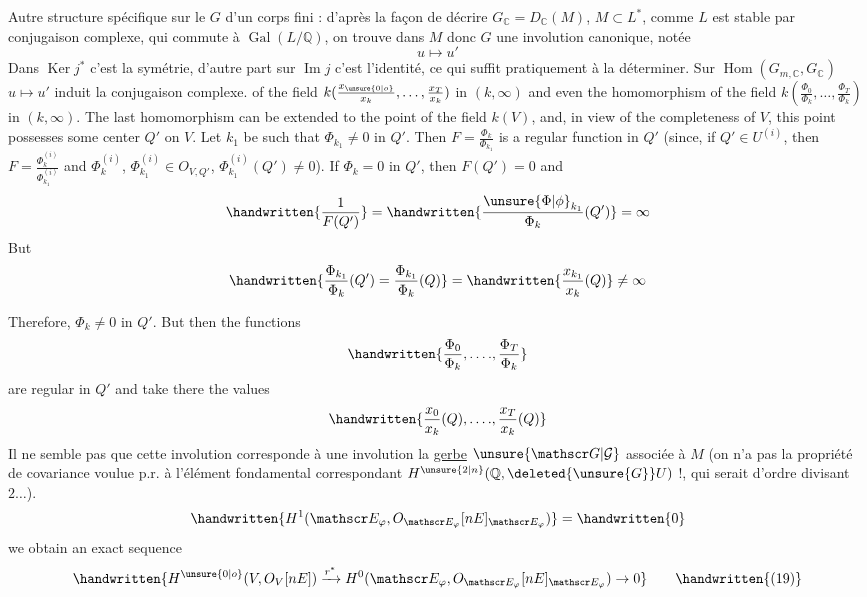 Autre structure spécifique sur le $G$ 
d'un corps fini : d'après la façon de
décrire $G_{\mathbb C}=D_{\mathbb C}(M)$, $M\subset L^*$, comme $L$ est
stable par conjugaison complexe, qui commute
à $\operatorname{Gal}(L/\mathbb Q)$, on trouve dans $M$ donc
$G$ une involution canonique, notée
\[
u\longmapsto u'
\]
Dans $\operatorname{Ker}j^*$ c'est la symétrie, d'autre part sur $\operatorname{Im}j$ c'est
l'identité, ce qui suffit pratiquement à la déterminer. Sur
$\operatorname{Hom}(G_{m,\mathbb C},G_{\mathbb C})$ $u\mapsto u'$ induit la conjugaison complexe.
of the field $k(\frac{x_{\unsure{0|o}}}{x_k},\ldots,\frac{x_T}{x_k})$ in $(k,\infty)$ and even the
homomorphism of the field $k(\frac{\Phi_0}{\Phi_k},\ldots,\frac{\Phi_T}{\Phi_k})$ in $(k,\infty)$. The
last homomorphism can be extended to the point of the
field $k(V)$, and, in view of the completeness of $V$,
this\unsure{,} point possesses some center $Q'$ on $V$. Let $k_1$
be such that $\Phi_{k_1}\ne0$ in $Q'$. Then $F=\frac{\Phi_k}{\Phi_{k_1}}$ is a
regular function in $Q'$
(since, if $Q'\in U^{(i)}$, then $F=\frac{\Phi_k^{(i)}}{\Phi_{k_1}^{(i)}}$ and $\Phi_k^{(i)}$,
$\Phi_{k_1}^{(i)}\in O_{V,Q'}$, $\Phi_{k_1}^{(i)}(Q')\ne0$). If $\Phi_k=0$ in $Q'$,
then $F(Q')=0$ and
\[
\handwritten{\frac{1}{F(Q')}}=\handwritten{\frac{\unsure{\Phi|\phi}_{k_1}}{\Phi_k}(Q')}=\infty
\]
But
\[
\handwritten{\frac{\Phi_{k_1}}{\Phi_k}(Q')=\frac{\Phi_{k_1}}{\Phi_k}(Q)}=\handwritten{\frac{x_{k_1}}{x_k}(Q)}\ne\infty
\]

Therefore, $\Phi_k\ne0$ in $Q'$. But then the functions
\[
\handwritten{\frac{\Phi_0}{\Phi_k},\ldots\mathord{.},\frac{\Phi_T}{\Phi_k}}
\]
are regular in $Q'$ and take there the values
\[
\handwritten{\frac{x_0}{x_k}(Q),\ldots\mathord{.},\frac{x_T}{x_k}(Q)}
\]
Il ne semble pas que cette involution corresponde
à une involution  la \uline{gerbe} $\unsure{\mathscr G|\mathcal G}$ associée à
$M$ (on  n'a pas la propriété de
covariance voulue p.r. à l'élément fondamental
correspondant  $H^{\unsure{2|n}}(\mathbb Q,\deleted{\unsure{G}}U)$ !, qui
serait  d'ordre divisant $2\ldots$).
\[
\handwritten{H^1(\mathscr E_{\varphi},O_{\mathscr E_{\varphi}}[nE]_{\mathscr E_{\varphi}})}=\handwritten{0}
\]
we obtain an exact sequence
\[
\handwritten{H^{\unsure{0|o}}(V,O_V[nE])\xrightarrow{r^*}H^0(\mathscr E_{\varphi},O_{\mathscr E_{\varphi}}[nE]_{\mathscr E_{\varphi}})\to0}\tag*{\handwritten{(19)}}
\]

